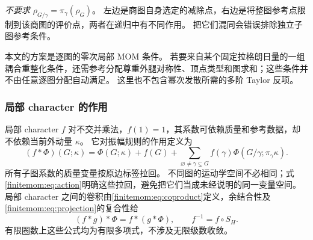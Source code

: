 \documentclass[11pt,a4paper,oneside]{ctexart}
\theoremstyle{cnplain}
\theoremstyle{definition}
\theoremstyle{remark}
\numberwithin{equation}{section}
\begin{document}
\emph{不要求} $\rho_{G/\gamma}=\pi_\gamma(\rho_G)$。
左边是商图自身选定的减除点，右边是将整图参考点限制到该商图的评价点，两者在递归中有不同作用。
把它们混同会错误排除独立子图参考条件。

本文的方案是逐图的零次局部 MOM 条件。
若要来自某个固定拉格朗日量的一组耦合重整化条件，还需参考分配尊重外腿对称性、顶点类型和图求和；这些条件并不由任意逐图分配自动满足。
这里也不包含幂次发散所需的多阶 Taylor 反项。

\subsubsection{局部 character 的作用}
局部 character $f$ 对不交并乘法，$f(1)=1$，其系数可依赖质量和参考数据，却不依赖当前外动量 $\kappa$。
它对振幅规则的作用定义为
\begin{equation}\label{finitemom:eq:action}
 (f*\Phi)(G;\kappa)=\Phi(G;\kappa)+f(G)
   +\sum_{\varnothing\ne\gamma\subsetneq G}
        f(\gamma)\Phi(G/\gamma;\pi_\gamma\kappa).
\end{equation}
所有子图系数的质量变量按原边标签拉回。
不同图的运动学空间不必相同；式\eqref{finitemom:eq:action}明确这些拉回，避免把它们当成未经说明的同一变量空间。
局部 character 之间的卷积由\eqref{finitemom:eq:coproduct}定义，余结合性及\eqref{finitemom:eq:projection}的复合性给
\begin{equation}\label{finitemom:eq:associative}
 (f*g)*\Phi=f*(g*\Phi),\qquad f^{-1}=f\circ S_H.
\end{equation}
有限圈数上这些公式均为有限多项式，不涉及无限级数收敛。
\end{document}
